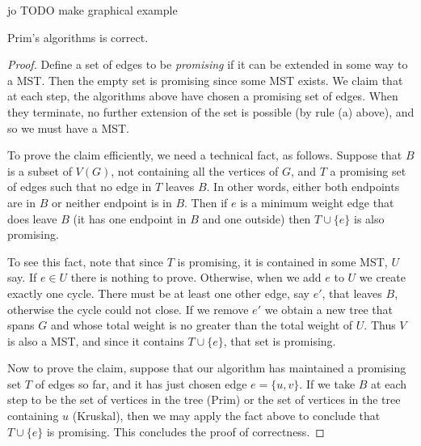 jo TODO make graphical example



\begin{Theorem}
\label{thm:prim}
Prim's algorithms is correct.
\end{Theorem}

\begin{proof}
Define a set of edges to be \emph{promising} if it can be
extended in some way to a MST. Then the empty set is promising since
some MST exists. We claim that at each step, the algorithms above have
chosen a promising set of edges. When they terminate, no further
extension of the set  is possible (by rule (a) above), and so we must
have a MST.

To prove the claim efficiently, we need a technical fact, as follows.
Suppose that $B$ is a subset of $V(G)$, not containing all the vertices
of $G$, and $T$ a promising set of edges such that no edge in $T$ leaves
$B$. In other words, either both endpoints are in $B$ or neither
endpoint is in $B$. Then if $e$ is a minimum weight edge that does leave
$B$ (it has one endpoint in $B$ and one outside) then $T\cup\{e\}$ is
also promising.

To see this fact, note that since $T$ is promising, it is contained in
some MST, $U$ say. If $e\in U$ there is nothing to prove. Otherwise,
when we add $e$ to $U$ we create exactly one cycle. There must be at
least one other edge, say $e'$, that leaves $B$, otherwise the cycle
could not close. If we remove $e'$ we obtain a new tree that spans $G$
and whose total weight is no greater than the total weight of $U$. Thus
$V$ is also a MST, and since it contains $T\cup\{e\}$, that set is
promising.

Now to prove the claim, suppose that our algorithm has maintained a
promising set $T$ of edges so far, and it has just chosen edge $e=\{u,v\}$.
If we take $B$ at each step to be the set of vertices in the tree (Prim)
or the set of vertices in the tree containing $u$ (Kruskal), then we may
apply the fact above to conclude that $T \cup \{e\}$ is promising. This
concludes the proof of correctness.
\end{proof}

